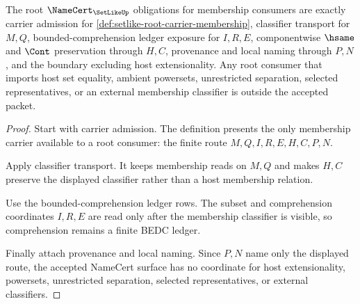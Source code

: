 \begin{theorem}\label{thm:setlike-root-namecert-obligations}
The root $\NameCert_{\SetLikeUp}$ obligations for membership consumers are exactly carrier admission for \autoref{def:setlike-root-carrier-membership}, classifier transport for $M,Q$, bounded-comprehension ledger exposure for $I,R,E$, componentwise $\hsame$ and $\Cont$ preservation through $H,C$, provenance and local naming through $P,N$, and the boundary excluding host extensionality. Any root consumer that imports host set equality, ambient powersets, unrestricted separation, selected representatives, or an external membership classifier is outside the accepted packet.
\end{theorem}
\begin{proof}
Start with carrier admission. The definition presents the only membership carrier available to a root consumer: the finite route $M,Q,I,R,E,H,C,P,N$.

Apply classifier transport. It keeps membership reads on $M,Q$ and makes $H,C$ preserve the displayed classifier rather than a host membership relation.

Use the bounded-comprehension ledger rows. The subset and comprehension coordinates $I,R,E$ are read only after the membership classifier is visible, so comprehension remains a finite BEDC ledger.

Finally attach provenance and local naming. Since $P,N$ name only the displayed route, the accepted NameCert surface has no coordinate for host extensionality, powersets, unrestricted separation, selected representatives, or external classifiers.
\end{proof}

